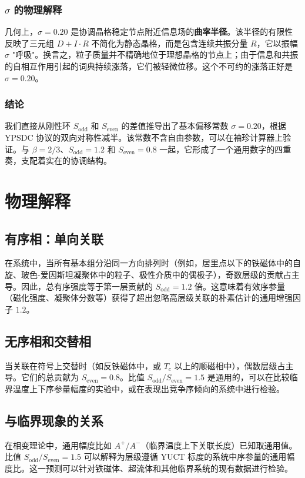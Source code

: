 \documentclass[12pt,a4paper]{article}
\begin{document}
	\subsubsection{\(\sigma\) 的物理解释}
	
	几何上，\(\sigma = 0.20\) 是协调晶格稳定节点附近信息场的\textbf{曲率半径}。该半径的有限性反映了三元组 \(D+I\cdot R\) 不简化为静态晶格，而是包含连续共振分量 \(R\)，它以振幅 \(\sigma\) "呼吸"。换言之，粒子质量并不精确地位于理想晶格的节点上；由于信息和共振的自相互作用引起的词典持续涨落，它们被轻微位移。这个不可约的涨落正好是 \(\sigma = 0.20\)。
	
	\subsubsection{结论}
	
	我们直接从刚性环 \(S_{\mathrm{odd}}\) 和 \(S_{\mathrm{even}}\) 的差值推导出了基本偏移常数 \(\sigma = 0.20\)，根据 YPSDC 协议的双向对称性减半。该常数不含自由参数，可以在袖珍计算器上验证。与 \(\beta = 2/3\)、\(S_{\mathrm{odd}} = 1.2\) 和 \(S_{\mathrm{even}} = 0.8\) 一起，它形成了一个通用数字的四重奏，支配着实在的协调结构。
	
	\section{物理解释}
	
	\subsection{有序相：单向关联}
	在系统中，当所有基本组分沿同一方向排列时（例如，居里点以下的铁磁体中的自旋、玻色-爱因斯坦凝聚体中的粒子、极性介质中的偶极子），奇数层级的贡献占主导。因此，总有序强度等于第一层贡献的 \(S_{\text{odd}} = 1.2\) 倍。这意味着有效序参量（磁化强度、凝聚体分数等）获得了超出忽略高层级关联的朴素估计的通用增强因子 \(1.2\)。
	
	\subsection{无序相和交替相}
	当关联在符号上交替时（如反铁磁体中，或 \(T_c\) 以上的顺磁相中），偶数层级占主导。它们的总贡献为 \(S_{\text{even}} = 0.8\)。比值 \(S_{\text{odd}}/S_{\text{even}} = 1.5\) 是通用的，可以在比较临界温度上下序参量幅度的实验中，或在表现出竞争序倾向的系统中进行检验。
	
	\subsection{与临界现象的关系}
	在相变理论中，通用幅度比如 \(A^+/A^-\)（临界温度上下关联长度）已知取通用值。比值 \(S_{\text{odd}}/S_{\text{even}} = 1.5\) 可以解释为层级遵循 YUCT 标度的系统中序参量的通用幅度比。这一预测可以针对铁磁体、超流体和其他临界系统的现有数据进行检验。
	
\end{document}
